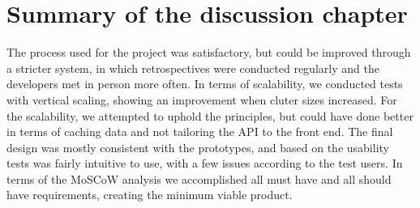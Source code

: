 \section{Summary of the discussion chapter}
The process used for the project was satisfactory, but could be improved through a stricter system, in which retrospectives were conducted regularly and the developers met in person more often.
In terms of scalability, we conducted tests with vertical scaling, showing an improvement when cluter sizes increased.
For the scalability, we attempted to uphold the principles, but could have done better in terms of caching data and not tailoring the API to the front end.
The final design was mostly consistent with the prototypes, and based on the usability tests was fairly intuitive to use, with a few issues according to the test users.
In terms of the MoSCoW analysis we accomplished all must have and all should have requirements, creating the minimum viable product.